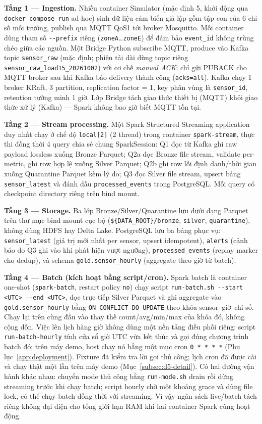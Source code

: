 \textbf{Tầng 1 --- Ingestion.} Nhiều container Simulator (mặc định 5, khởi động
qua \texttt{docker compose run} ad-hoc) sinh dữ liệu cảm biến giả lập gồm tập con
của 6 chỉ số môi trường, publish qua MQTT QoS1 tới broker Mosquitto. Mỗi container
dùng tham số \texttt{-{}-prefix} riêng (\texttt{zoneA}\ldots\texttt{zoneE}) để
đảm bảo \texttt{event\_id} không trùng chéo giữa các nguồn. Một Bridge Python
subscribe MQTT, produce vào Kafka topic \texttt{sensor\_raw} (mặc định; phiên tải dài dùng topic riêng \texttt{sensor\_raw\_load15\_20261002}) với cơ chế
\emph{manual ACK}: chỉ gửi PUBACK cho MQTT broker sau khi Kafka báo delivery
thành công (\texttt{acks=all}). Kafka chạy 1 broker KRaft, 3 partition,
replication factor = 1, key phân vùng là \texttt{sensor\_id}, retention tường
minh 1 giờ. Lớp Bridge tách giao thức thiết bị (MQTT) khỏi giao thức xử lý
(Kafka) --- Spark không bao giờ biết MQTT tồn tại.

\textbf{Tầng 2 --- Stream processing.} Một Spark Structured Streaming application
duy nhất chạy ở chế độ \texttt{local[2]} (2 thread) trong container
\texttt{spark-stream}, thực thi đồng thời 4 query chia sẻ chung SparkSession:
Q1 đọc từ Kafka ghi raw payload lossless xuống Bronze Parquet; Q2a đọc Bronze
file stream, validate per-metric, ghi row hợp lệ xuống Silver Parquet; Q2b ghi
row lỗi định danh/thời gian xuống Quarantine Parquet kèm lý do; Q3 đọc Silver file
stream, upsert bảng \texttt{sensor\_latest} và đánh dấu \texttt{processed\_events}
trong PostgreSQL. Mỗi query có checkpoint directory riêng trên bind mount.

\textbf{Tầng 3 --- Storage.} Ba lớp Bronze/Silver/Quarantine lưu dưới dạng
Parquet trên thư mục bind mount cục bộ (\texttt{\$\{DATA\_ROOT\}/bronze},
\texttt{silver}, \texttt{quarantine}), không dùng HDFS hay Delta Lake. PostgreSQL
lưu ba bảng phục vụ: \texttt{sensor\_latest} (giá trị mới nhất per sensor,
upsert idempotent), \texttt{alerts} (cảnh báo do Q3 ghi vào khi phát hiện
vượt ngưỡng), \texttt{processed\_events} (replay marker cho dedup), và
schema \texttt{gold.sensor\_hourly} (aggregate theo giờ từ batch).

\textbf{Tầng 4 --- Batch (kích hoạt bằng script/cron).} Spark batch là container
one-shot (\texttt{spark-batch}, restart policy \texttt{no}) chạy script
\texttt{run-batch.sh -{}-start <UTC> -{}-end <UTC>}, đọc trực tiếp Silver Parquet
và ghi aggregate vào \texttt{gold.sensor\_hourly} bằng
\texttt{ON CONFLICT DO UPDATE} theo khóa sensor--giờ--chỉ số. Chạy lại trên
cùng đầu vào thay thế count/avg/min/max của khóa đó, không cộng dồn. Việc lên lịch hàng giờ không dùng một nền tảng
điều phối riêng: script \texttt{run-batch-hourly} tính cửa sổ giờ UTC vừa kết
thúc và gọi đúng chương trình batch đó; trên máy demo, host chạy nó bằng một
mục cron \texttt{0 * * * *} (Phụ lục~\ref{app:deployment}). Fixture đã
kiểm tra lời gọi thủ công; lịch cron đã được cài và chạy thật một lần trên máy
demo (Mục~\ref{subsec:d5-detail}).
Có hai đường vận hành khác nhau: chuyển mode thủ công bằng
\texttt{run-mode.sh} drain rồi dừng streaming trước khi chạy batch; script
hourly chờ một khoảng grace và dùng file lock, có thể chạy batch đồng thời
với streaming. Vì vậy ngân sách live/batch tách riêng không đại diện cho
tổng giới hạn RAM khi hai container Spark cùng hoạt động.

